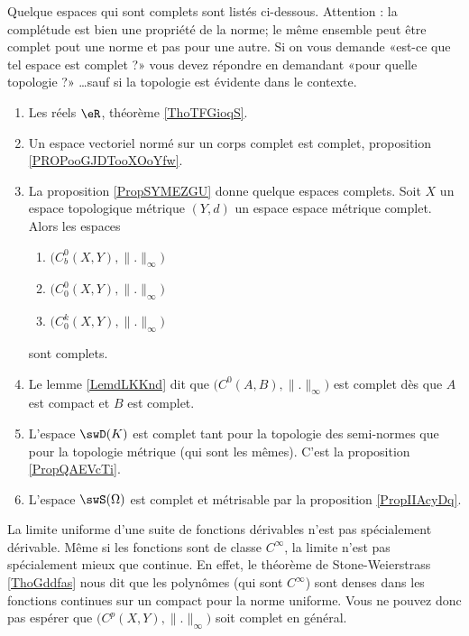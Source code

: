 Quelque espaces qui sont complets sont listés ci-dessous. Attention : la complétude est bien une propriété de la norme; le même ensemble peut être complet pout une norme et pas pour une autre. Si on vous demande «est-ce que tel espace est complet ?» vous devez répondre en demandant «pour quelle topologie ?» \ldots sauf si la topologie est évidente dans le contexte.
\begin{multicols}{2}
    \begin{enumerate}
        \item
            Les réels \( \eR\), théorème \ref{ThoTFGioqS}. 
        \item
            Un espace vectoriel normé sur un corps complet est complet, proposition \ref{PROPooGJDTooXOoYfw}.
        \item
            La proposition \ref{PropSYMEZGU} donne quelque espaces complets. Soit \( X\) un espace topologique métrique \( (Y,d)\) un espace espace métrique complet. Alors les espaces
    \begin{enumerate}
        \item
            \( \big( C^0_b(X,Y),\| . \|_{\infty} \big)\) 
        \item
            \( \big( C^0_0(X,Y),\| . \|_{\infty} \big)\)
        \item
            \( \big( C^k_0(X,Y),\| . \|_{\infty} \big)\)
    \end{enumerate} 
    sont complets.
\item
    Le lemme \ref{LemdLKKnd} dit que \( \big( C^0(A,B),\| . \|_{\infty}\big)\) est complet dès que \( A\) est compact et \( B\) est complet.

\item
    L'espace \( \swD(K)\) est complet tant pour la topologie des semi-normes que pour la topologie métrique (qui sont les mêmes). C'est la proposition \ref{PropQAEVcTi}.
\item
    L'espace \( \swS(\Omega)\) est complet et métrisable par la proposition \ref{PropIIAcyDq}.
    \end{enumerate}
\end{multicols}

    La limite uniforme d'une suite de fonctions dérivables n'est pas spécialement dérivable. Même si les fonctions sont de classe \(  C^{\infty}\), la limite n'est pas spécialement mieux que continue. En effet, le théorème de Stone-Weierstrass \ref{ThoGddfas} nous dit que les polynômes (qui sont \(  C^{\infty}\)) sont denses dans les fonctions continues sur un compact pour la norme uniforme. Vous ne pouvez donc pas espérer que \( \big( C^p(X,Y),\| . \|_{\infty} \big)\) soit complet en général.

